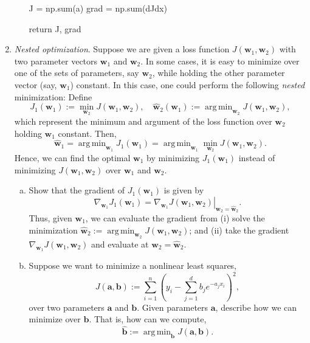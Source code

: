 \documentclass[11pt]{article}
\def\argmin{\mathop{\mathrm{arg\,min}}}
\newcommand{\abf}{\mathbf{a}}
\newcommand{\bbf}{\mathbf{b}}
\newcommand{\wbf}{\mathbf{w}}
\newcommand{\wbfhat}{\widehat{\mathbf{w}}}
\begin{document}
\begin{enumerate}
\begin{enumerate}[(a)]
\begin{python}
	J = np.sum(a)
	grad = np.sum(dJdx)
	
	return J, grad
\end{python}
\end{enumerate}

\item \emph{Nested optimization}.  Suppose we are given a loss function
$J(\wbf_1,\wbf_2)$ with two parameter vectors $\wbf_1$ and $\wbf_2$.
In some cases, it is easy to minimize over one of the sets of parameters, say
$\wbf_2$, while holding the other parameter vector (say, $\wbf_1$) constant.
In this case, one could perform the following \emph{nested} minimization:
Define
\[
    J_1(\wbf_1) := \min_{\wbf_2} J(\wbf_1,\wbf_2), \quad
    \wbfhat_2(\wbf_1) := \argmin_{\wbf_2} J(\wbf_1,\wbf_2),
\]
which represent the minimum and argument of the loss function over $\wbf_2$
holding $\wbf_1$ constant.   Then,
\[
    \wbfhat_1 = \argmin_{\wbf_1} J_1(\wbf_1) = \argmin_{\wbf_1} \min_{\wbf_2}
    J(\wbf_1,\wbf_2).
\]
Hence, we can find the optimal $\wbf_1$ by minimizing $J_1(\wbf_1)$
instead of minimizing $J(\wbf_1,\wbf_2)$ over $\wbf_1$ and $\wbf_2$.
\begin{enumerate}[(a)]
\item Show that the gradient of $J_1(\wbf_1)$ is given by
\[
    \nabla_{\wbf_1} J_1(\wbf_1) = \left. \nabla_{\wbf_1} J(\wbf_1,\wbf_2)\right|_{\wbf_2=\wbfhat_2}.
\]
Thus, given $\wbf_1$, we can evaluate the gradient from (i) solve the minimization
$\wbfhat_2:= \argmin_{\wbf_2} J(\wbf_1,\wbf_2)$; and (ii) take the gradient
$\nabla_{\wbf_1} J(\wbf_1,\wbf_2)$ and evaluate at $\wbf_2 = \wbfhat_2$.

\item Suppose we want to minimize a nonlinear least squares,
\[
    J(\abf,\bbf) := \sum_{i=1}^n \left( y_i -
        \sum_{j=1}^d b_j e^{-a_jx_i} \right)^2,
\]
over two parameters $\abf$ and $\bbf$.  Given parameters $\abf$,
describe how we can minimize over $\bbf$.  That is, how can we compute,
\[
    \hat{\bbf} := \argmin_{\bbf} J(\abf,\bbf).
\]


\end{enumerate}
\end{enumerate}
\end{document}
